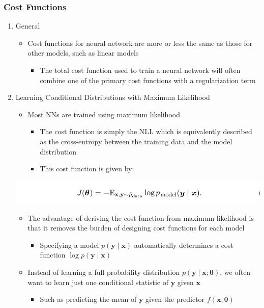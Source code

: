 \documentclass[11pt]{article}
\begin{document}
\subsubsection{Cost Functions}
\label{sec:org4103bbf}
\begin{enumerate}
\item General
\label{sec:org7755dcf}
\begin{itemize}
\item Cost functions for neural network are more or less the same as those for other models, such as linear models
\begin{itemize}
\item The total cost function used to train a neural network will often combine one of the primary cost functions with a regularization term
\end{itemize}
\end{itemize}

\item Learning Conditional Distributions with Maximum Likelihood
\label{sec:orgf79d5c8}
\begin{itemize}
\item Most NNs are trained using maximum likelihood
\begin{itemize}
\item The cost function is simply the NLL which is equivalently described as the cross-entropy between the training data and the model distribution
\item This cost function is given by:
\end{itemize}
\end{itemize}
\begin{center}
\includegraphics[width=.9\linewidth]{Deep Feedforward Networks/screenshot_2018-09-30_16-58-07.png}
\end{center}
\begin{itemize}
\item The advantage of deriving the cost function from maximum likelihood is that it removes the burden of designing cost functions for each model
\begin{itemize}
\item Specifying a model \(p(\pmb y \mid \pmb x)\) automatically determines a cost function \(\log p(\pmb y \mid \pmb x)\)
\end{itemize}

\item Instead of learning a full probability distribution \(p(\pmb y \mid \pmb x; \pmb \theta)\), we often want to learn just one conditional statistic of \(\pmb y\) given \(\pmb x\)
\begin{itemize}
\item Such as predicting the mean of \(\pmb y\) given the predictor \(f(\pmb x; \pmb \theta)\)
\end{itemize}
\end{itemize}


\end{enumerate}
\end{document}
